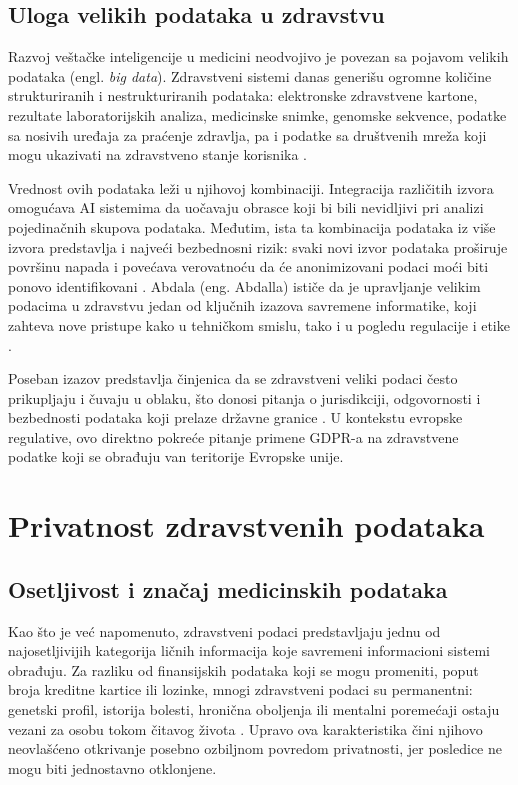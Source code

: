 \documentclass[12pt]{article}
\begin{document}
\subsection{Uloga velikih podataka u zdravstvu}
 
Razvoj veštačke inteligencije u medicini neodvojivo je povezan sa pojavom velikih podataka (engl. \textit{big data}). Zdravstveni sistemi danas generišu ogromne količine strukturiranih i nestrukturiranih podataka: elektronske zdravstvene kartone, rezultate laboratorijskih analiza, medicinske snimke, genomske sekvence, podatke sa nosivih uređaja za praćenje zdravlja, pa i podatke sa društvenih mreža koji mogu ukazivati na zdravstveno stanje korisnika \cite{abouelmehdi2017}.
 
Vrednost ovih podataka leži u njihovoj kombinaciji. Integracija različitih izvora omogućava AI sistemima da uočavaju obrasce koji bi bili nevidljivi pri analizi pojedinačnih skupova podataka. Međutim, ista ta kombinacija podataka iz više izvora predstavlja i najveći bezbednosni rizik: svaki novi izvor podataka proširuje površinu napada i povećava verovatnoću da će anonimizovani podaci moći biti ponovo identifikovani \cite{abouelmehdi2017}. Abdala (eng. Abdalla) ističe da je upravljanje velikim podacima u zdravstvu jedan od ključnih izazova savremene informatike, koji zahteva nove pristupe kako u tehničkom smislu, tako i u pogledu regulacije i etike \cite{abdalla2022}.
 
Poseban izazov predstavlja činjenica da se zdravstveni veliki podaci često prikupljaju i čuvaju u oblaku, što donosi pitanja o jurisdikciji, odgovornosti i bezbednosti podataka koji prelaze državne granice \cite{topol2019}. U kontekstu evropske regulative, ovo direktno pokreće pitanje primene GDPR-a na zdravstvene podatke koji se obrađuju van teritorije Evropske unije.
 
\newpage
\section{Privatnost zdravstvenih podataka}
\subsection{Osetljivost i značaj medicinskih podataka}
Kao što je već napomenuto, zdravstveni podaci predstavljaju jednu od najosetljivijih kategorija ličnih informacija koje savremeni informacioni sistemi obrađuju. Za razliku od finansijskih podataka koji 
se mogu promeniti, poput broja kreditne kartice ili lozinke, mnogi zdravstveni podaci su permanentni: genetski profil, istorija bolesti, hronična oboljenja ili mentalni poremećaji ostaju vezani za osobu tokom čitavog života \cite{murdoch2021}. Upravo ova karakteristika čini njihovo neovlašćeno otkrivanje posebno ozbiljnom povredom privatnosti, jer posledice ne mogu biti jednostavno otklonjene.
 
\end{document}
